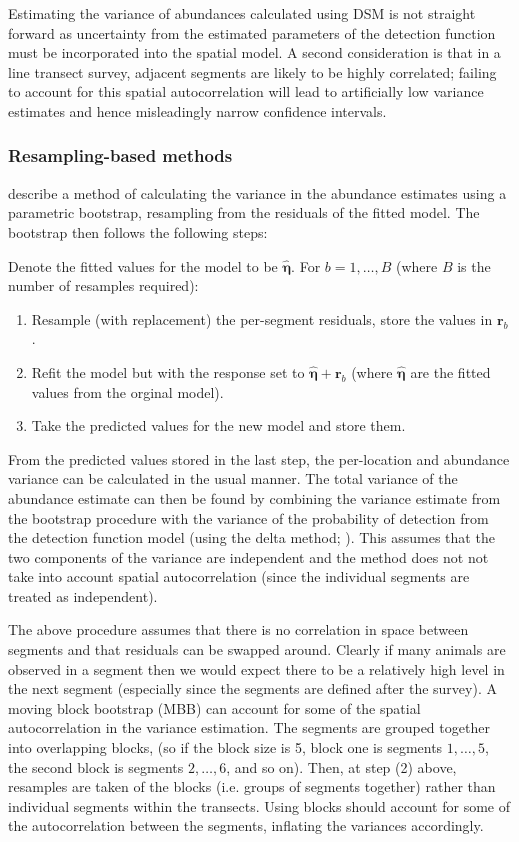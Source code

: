 \documentclass[a4paper,12pt]{article}
\begin{document}
Estimating the variance of abundances calculated using DSM is not straight forward as uncertainty from the estimated parameters of the detection function must be incorporated into the spatial model. A second consideration is that in a line transect survey, adjacent segments are likely to be highly correlated; failing to account for this spatial autocorrelation will lead to artificially low variance estimates and hence misleadingly narrow confidence intervals.

\subsubsection*{Resampling-based methods}

\cite{Hedley:2004et} describe a method of calculating the variance in the abundance estimates using a parametric bootstrap, resampling from the residuals of the fitted model. The bootstrap then follows the following steps:

Denote the fitted values for the model to be $\hat{\bm{\eta}}$. For $b=1,\ldots,B$ (where $B$ is the number of resamples required):
\begin{enumerate}
	\item Resample (with replacement) the per-segment residuals, store the values in $\mathbf{r}_{b}$.
	\item Refit the model but with the response set to $\hat{\bm{\eta}}+\mathbf{r}_{b}$ (where $\hat{\bm{\eta}}$ are the fitted values from the orginal model).
	\item Take the predicted values for the new model and store them.
\end{enumerate}
From the predicted values stored in the last step, the per-location and abundance variance can be calculated in the usual manner. The total variance of the abundance estimate can then be found by combining the variance estimate from the bootstrap procedure with the variance of the probability of detection from the detection function model (using the delta method; \cite{Seber:2002ti}). This assumes that the two components of the variance are independent and the method does not not take into account spatial autocorrelation (since the individual segments are treated as independent).

The above procedure assumes that there is no correlation in space between segments and that residuals can be swapped around. Clearly if many animals are observed in a segment then we would expect there to be a relatively high level in the next segment (especially since the segments are defined after the survey). A moving block bootstrap (MBB) can account for some of the spatial autocorrelation in the variance estimation. The segments are grouped together into overlapping blocks, (so if the block size is 5, block one is segments $1,\ldots,5$, the second block is segments $2,\ldots,6$, and so on). Then, at step (2) above, resamples are taken of the blocks (i.e. groups of segments together) rather than individual segments within the transects. Using blocks should account for some of the autocorrelation between the segments, inflating the variances accordingly.
\end{document}
